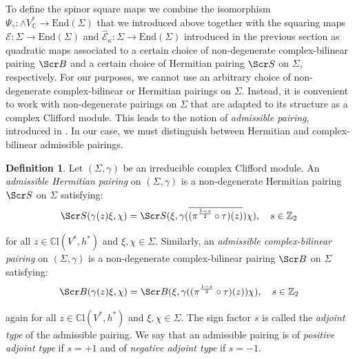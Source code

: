 \documentclass[10pt,a4paper,twoside,reqno]{amsart}
\theoremstyle{plain}
\theoremstyle{definition}
\newtheorem{definition}[thm]{Definition}
\theoremstyle{remark}
\newcommand{\End}{\mathrm{End}}
\def\C{\mathbb{C}}
\def\scB{\Scr B}
\def\scS{\Scr S}
\def\cE{\mathcal{E}}
\def\hcE{\widehat{\mathcal{E}}}
\begin{document}
\noindent
To define the spinor square maps we combine the isomorphism $\Psi_\gamma\colon\wedge V^*_\C\to\End(\Sigma)$ that we introduced above together with the squaring maps $\cE\colon\Sigma\to\End(\Sigma)$ and $\hcE_\kappa\colon\Sigma\to\End(\Sigma)$ introduced in the previous section as quadratic maps associated to a certain choice of non-degenerate complex-bilinear pairing $\scB$ and a certain choice of Hermitian pairing $\scS$ on $\Sigma$, respectively. For our purposes, we cannot use an arbitrary choice of non-degenerate complex-bilinear or Hermitian pairings on $\Sigma$. Instead, it is convenient to work with non-degenerate pairings on $\Sigma$ that are adapted to its structure as a complex Clifford module. This leads to the notion of \emph{admissible pairing}, introduced in \cite{AC97,ACDVP05}. In our case, we must distinguish between Hermitian and complex-bilinear admissible pairings.

\begin{definition}\label{def:admissible_pairing}
Let $(\Sigma,\gamma)$ be an irreducible complex Clifford module. An \emph{admissible Hermitian pairing} on $(\Sigma,\gamma)$ is a non-degenerate Hermitian pairing $\scS$ on $\Sigma$ satisfying:
\begin{equation*}
\scS(\gamma(z)\xi,\chi)=\scS(\xi,\gamma(\overline{(\pi^{\frac{1-s}{2}}\circ\tau)(z)})\chi),\quad s\in\mathbb{Z}_2
\end{equation*}

\noindent
for all $z\in\C\mathrm{l}(V^*,h^*)$ and $\xi,\chi\in\Sigma$. Similarly, an \emph{admissible complex-bilinear pairing} on $(\Sigma,\gamma)$ is a non-degenerate complex-bilinear pairing $\scB$ on $\Sigma$ satisfying:
\begin{equation*}
\scB(\gamma(z)\xi,\chi)=\scB(\xi,\gamma((\pi^{\frac{1-s}{2}}\circ\tau)(z))\chi),\quad s\in\mathbb{Z}_2
\end{equation*}

\noindent
again for all $z\in\C\mathrm{l}(V^*,h^*)$ and $\xi,\chi\in\Sigma$. The sign factor $s$ is called the \emph{adjoint type} of the admissible pairing. We say that an admissible pairing is of \emph{positive adjoint type} if $s=+1$ and of \emph{negative adjoint type} if $s=-1$.
\end{definition}
\end{document}

